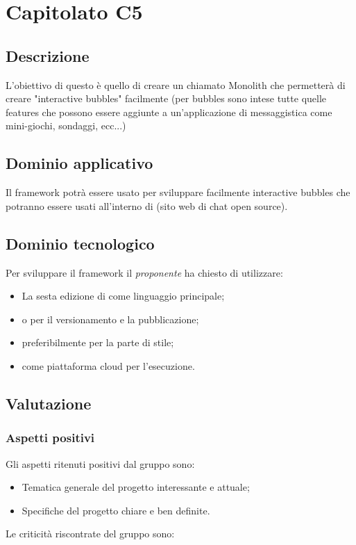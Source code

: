 \documentclass[../StudioDiFattibilita.tex]{subfiles}
\begin{document}
	\section{Capitolato C5}
		\subsection{Descrizione}
		L'obiettivo di questo  è quello di creare un  chiamato Monolith che permetterà di creare "interactive bubbles" facilmente (per bubbles sono intese tutte quelle features che possono essere aggiunte a un'applicazione di messaggistica come mini-giochi, sondaggi, ecc...)   
		\subsection{Dominio applicativo}
		Il framework potrà essere usato per sviluppare facilmente interactive bubbles che potranno essere usati all'interno di  (sito web di chat open source).
		\subsection{Dominio tecnologico}
		Per sviluppare il framework il \textit{proponente} ha chiesto di utilizzare:
			\begin{itemize}
			\item La sesta edizione di  come linguaggio principale; 
			\item {} o  per il versionamento e la pubblicazione;
			\item {} preferibilmente per la parte di stile;
			\item {} come piattaforma cloud per l'esecuzione.
			\end{itemize}
		\subsection{Valutazione}
			\subsubsection{Aspetti positivi}
			Gli aspetti ritenuti positivi dal gruppo sono:
				\begin{itemize}
				\item Tematica generale del progetto interessante e attuale;
				\item Specifiche del progetto chiare e ben definite.
				\end{itemize}
			Le criticità riscontrate del gruppo sono:	
\end{document}
